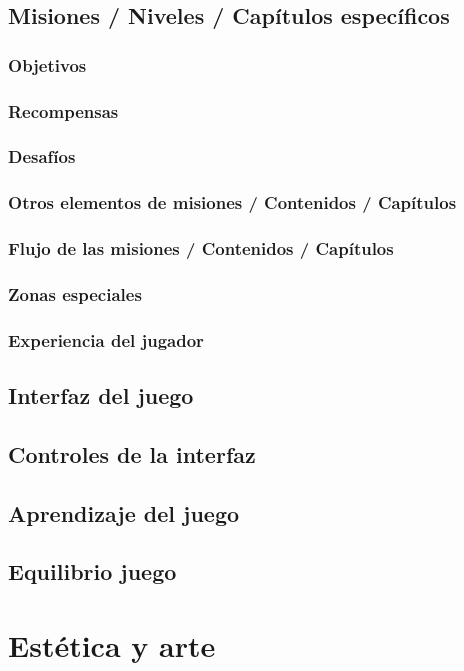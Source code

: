 \subsection{Misiones / Niveles / Capítulos específicos}
\subsubsection{Objetivos}
\subsubsection{Recompensas}
\subsubsection{Desafíos}
\subsubsection{Otros elementos de misiones / Contenidos / Capítulos}
\subsubsection{Flujo de las misiones / Contenidos / Capítulos}
\subsubsection{Zonas especiales}
\subsubsection{Experiencia del jugador}

\subsection{Interfaz del juego}
\subsection{Controles de la interfaz}
\subsection{Aprendizaje del juego}
\subsection{Equilibrio juego}



\section{Estética y arte}
